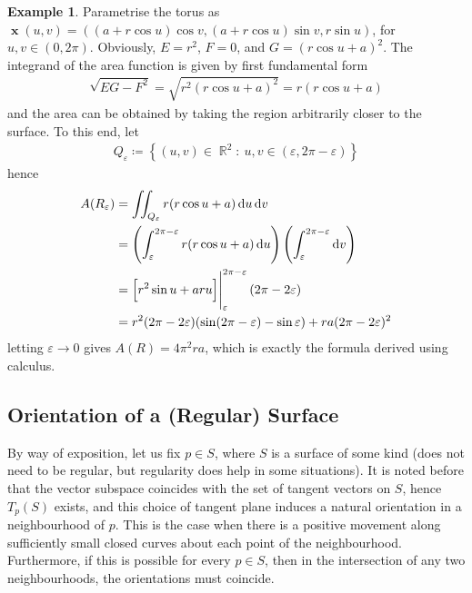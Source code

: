 \documentclass{amsart} %
\renewcommand{\epsilon}{\varepsilon}
\theoremstyle{mytheoremstyle}
\theoremstyle{definition}
\newtheorem{example}[definition]{Example}
\numberwithin{equation}{section}
\DeclareMathOperator{\R}{\mathbb{R}}
\DeclareMathOperator{\1}{\mathbbm{1}}
\DeclareMathOperator{\D}{\dif}
\DeclareMathOperator{\x}{\mathbf{x}}
\renewcommand{\epsilon}{\varepsilon}
\newcommand{\condset}[4]{\left\{ #1  : \: #2 #3 #4 \right\}}
\renewcommand{\epsilon}{\varepsilon}
\begin{document}
\begin{example}
	\label{exampleareaoftorus}
	Parametrise the torus as $\x(u,v) = ((a+r\cos u)\cos v , (a+r\cos u) \sin v, r \sin u)$, for $u,v \in (0,2\pi)$. Obviously, $E = r^2$, $F =0 $, and $G = (r \cos u + a)^2$. The integrand of the area function is given by first fundamental form
	\begin{align*}
		\sqrt{EG - F^2} = \sqrt{r^2 (r \cos u + a)^2} = r (r \cos u + a)
	\end{align*}
	and the area can be obtained by taking the region arbitrarily closer to the surface. To this end, let
	\begin{align*}
	Q_{\epsilon} \coloneqq \condset{(u,v) \in \R^2}{u,v}{\in}{(\epsilon,2\pi-\epsilon)}
	\end{align*}
	hence
	\begin{align*}
	A(R_\epsilon) &= \iint_{Q_\epsilon} r (r \cos u + a) \D u \D v \\
	&= \left( \int_{\epsilon}^{2\pi-\epsilon} r(r \cos u +a) \D u \right) \left( \int_{\epsilon}^{2\pi-\epsilon} \D v \right) \\
	&= \eval{\left[ r^2 \sin u + a r u \right]}_{\epsilon}^{2\pi - \epsilon} (2\pi - 2\epsilon)  \\
	&= r^2 (2\pi - 2\epsilon) (\sin(2\pi - \epsilon) - \sin \epsilon) + ra (2\pi - 2\epsilon)^2
	\end{align*}
	letting $\epsilon \to 0$ gives $A(R) = 4\pi^2 r a$, which is exactly the formula derived using calculus.
\end{example}



\subsection{Orientation of a (Regular) Surface}
By way of exposition, let us fix $p \in S$, where $S$ is a surface of some kind (does not need to be regular, but regularity does help in some situations). It is noted before that the vector subspace coincides with the set of tangent vectors on $S$, hence $T_p (S)$ exists, and this choice of tangent plane induces a natural orientation in a neighbourhood of $p$. This is the case when there is a positive movement along sufficiently small closed curves about each point of the neighbourhood. Furthermore, if this is possible for every $p \in S$, then in the intersection of any two neighbourhoods, the orientations must coincide. 
\end{document}
